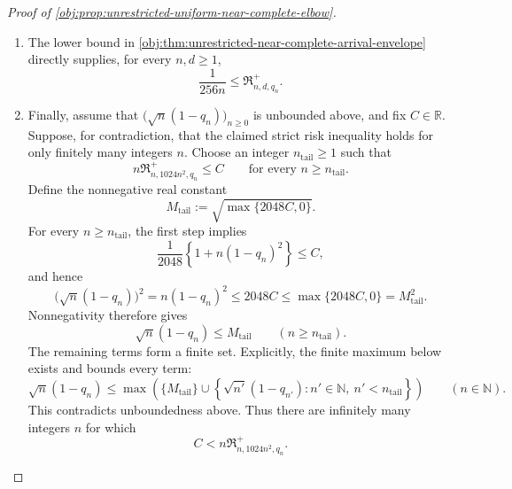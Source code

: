\begin{proof}[Proof of \cref{obj:prop:unrestricted-uniform-near-complete-elbow}]
\begin{enumerate}
\item The lower bound in \cref{obj:thm:unrestricted-near-complete-arrival-envelope} directly supplies, for every \(n,d\ge1\),
\[
\frac1{256n}\le\mathfrak R^{+}_{n,d,q_n}.
\]

\item Finally, assume that \(\bigl(\sqrt n(1-q_n)\bigr)_{n\ge0}\) is unbounded above, and fix \(C\in\mathbb R\). Suppose, for contradiction, that the claimed strict risk inequality holds for only finitely many integers \(n\). Choose an integer \(n_{\mathrm{tail}}\ge1\) such that
\[
n\mathfrak R^{+}_{n,1024n^2,q_n}\le C
\qquad\text{for every }n\ge n_{\mathrm{tail}}.
\]
Define the nonnegative real constant
\[
M_{\mathrm{tail}}:=\sqrt{\max\{2048C,0\}}.
\]
For every \(n\ge n_{\mathrm{tail}}\), the first step implies
\[
\frac1{2048}\left\{1+n(1-q_n)^2\right\}\le C,
\]
and hence
\[
\bigl(\sqrt n(1-q_n)\bigr)^2
=n(1-q_n)^2
\le2048C
\le\max\{2048C,0\}
=M_{\mathrm{tail}}^2.
\]
Nonnegativity therefore gives
\[
\sqrt n(1-q_n)\le M_{\mathrm{tail}}
\qquad(n\ge n_{\mathrm{tail}}).
\]
The remaining terms form a finite set. Explicitly, the finite maximum below exists and bounds every term:
\[
\sqrt n(1-q_n)
\le
\max\left(
\{M_{\mathrm{tail}}\}
\cup
\left\{\sqrt{n'}(1-q_{n'}):
n'\in\mathbb N,\ n'<n_{\mathrm{tail}}\right\}
\right)
\qquad(n\in\mathbb N).
\]
This contradicts unboundedness above. Thus there are infinitely many integers \(n\) for which
\[
C<n\mathfrak R^{+}_{n,1024n^2,q_n}.
\]
\end{enumerate}
\end{proof}

